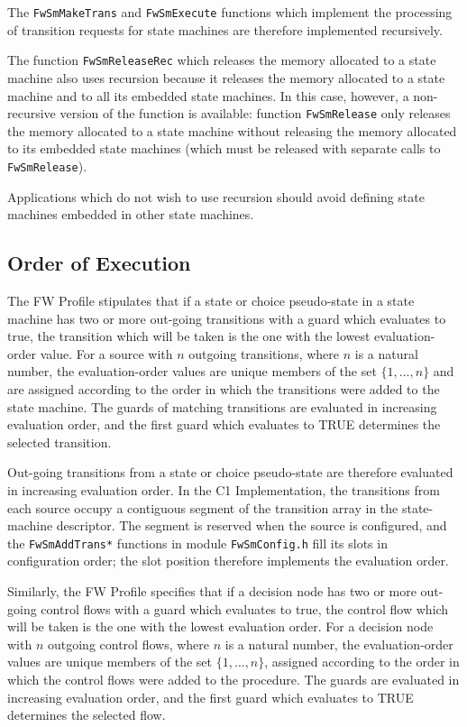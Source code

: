 \documentclass[manual]{../fwprofile}
\begin{document}
The \texttt{FwSmMakeTrans} and \texttt{FwSmExecute} functions which implement the processing of 
transition requests for state machines are therefore implemented recursively.

The function \texttt{FwSmReleaseRec} which releases the memory allocated to a state machine also 
uses recursion because it releases the memory allocated 
to a state machine and to all its embedded state machines. In this case, however, a non-recursive 
version of the function is available: function 
\texttt{FwSmRelease} only releases the memory allocated to a state machine without releasing 
the memory allocated to its embedded state machines 
(which must be released with separate calls to \texttt{FwSmRelease}).



Applications which do not wish to use recursion should avoid defining state machines embedded 
in other state machines.

\subsection{Order of Execution}
The FW Profile stipulates that if a state or choice pseudo-state in a state machine has two or more out-going transitions with a guard which evaluates to true, the transition 
which will be taken is the one with the lowest evaluation-order value. For a source with $n$ outgoing transitions, where $n$ is a natural number,
the evaluation-order values are unique members of the set $\{1,\ldots,n\}$ and are assigned according to the order in which the transitions were added
to the state machine. The guards of matching transitions are evaluated in increasing evaluation order, and the first guard which evaluates to TRUE
determines the selected transition.

Out-going transitions from a state or choice pseudo-state are therefore evaluated in increasing evaluation order. In the C1 Implementation, the transitions
from each source occupy a contiguous segment of the transition array in the state-machine descriptor. The segment is reserved when the source is configured,
and the \texttt{FwSmAddTrans*} functions in module \texttt{FwSmConfig.h} fill its slots in configuration order; the slot position therefore implements
the evaluation order.

Similarly, the FW Profile specifies that if a decision node has two or more out-going 
control flows with a guard which evaluates to true, the control flow 
which will be taken is the one with the lowest evaluation order. For a decision node with $n$ outgoing control flows, where $n$ is a natural number,
the evaluation-order values are unique members of the set $\{1,\ldots,n\}$, assigned according to the order in which the control flows were added
to the procedure. The guards are evaluated in increasing evaluation order, and the first guard which evaluates to TRUE determines the selected flow.
\end{document}

